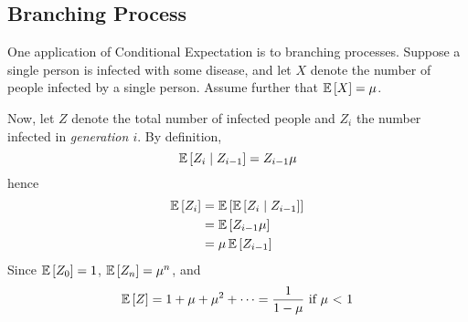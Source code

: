 \subsection{Branching Process}
One application of Conditional Expectation is to branching processes. Suppose a
single person is infected with some disease, and let $X$ denote the number of
people infected by a single person. Assume further that $\operatorname{\mathbb{E}}\left[X\right] = \mu$. 

Now, let $Z$ denote the total number of infected people and $Z_i$ the number
infected in \emph{generation $i$}. By definition,
\[\operatorname{\mathbb{E}}\left[Z_i \mid Z_{i - 1}\right] = Z_{i - 1}\mu\]
hence
\begin{align*}\operatorname{\mathbb{E}}\left[Z_i\right]
    &= \operatorname{\mathbb{E}}\left[\operatorname{\mathbb{E}}\left[Z_i \mid Z_{i - 1}\right]\right]\\
    &= \operatorname{\mathbb{E}}\left[Z_{i-1} \mu\right]\\
    &= \mu\operatorname{\mathbb{E}}\left[Z_{i - 1}\right]
\end{align*}
Since $\operatorname{\mathbb{E}}\left[Z_0\right] = 1$, $\operatorname{\mathbb{E}}\left[Z_n\right] = \mu^n$, and
\[\operatorname{\mathbb{E}}\left[Z\right] = 1 + \mu + \mu^2 + \dots = \frac{1}{1 - \mu} \hbox{ if $\mu$ < 1}\]